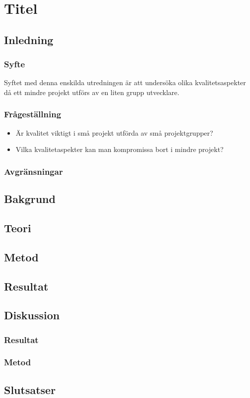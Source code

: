 \section{Titel}
\subsection{Inledning}

\subsubsection{Syfte}
Syftet med denna enskilda utredningen är att undersöka olika kvalitetsaspekter då ett mindre projekt utförs av en liten grupp utvecklare.
\subsubsection{Frågeställning}
\begin{itemize}
\item Är kvalitet viktigt i små projekt utförda av små projektgrupper?
\item Vilka kvalitetaspekter kan man kompromissa bort i mindre projekt?
  
\end{itemize}
\subsubsection{Avgränsningar}
\subsection{Bakgrund}
\subsection{Teori}
\subsection{Metod}
\subsection{Resultat}
\subsection{Diskussion}
\subsubsection{Resultat}
\subsubsection{Metod}
\subsection{Slutsatser}
